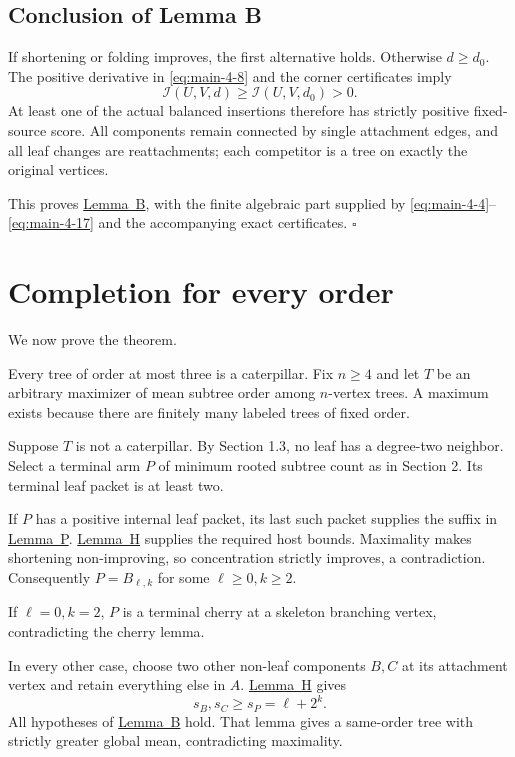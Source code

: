 \documentclass[11pt,letterpaper]{article}
\theoremstyle{plain}
\begin{document}
\subsection{Conclusion of Lemma B}\label{conclusion-of-lemma-b}

If shortening or folding improves, the first alternative holds. Otherwise \(d\ge d_0\). The positive derivative in \eqref{eq:main-4-8} and the corner certificates imply \[
\mathcal I(U,V,d)\ge\mathcal I(U,V,d_0)>0.
\] At least one of the actual balanced insertions therefore has strictly positive fixed-source score. All components remain connected by single attachment edges, and all leaf changes are reattachments; each competitor is a tree on exactly the original vertices.

This proves \hyperref[lem:broom]{Lemma~B}, with the finite algebraic part supplied by \eqref{eq:main-4-4}--\eqref{eq:main-4-17} and the accompanying exact certificates. \hfill\(\square\)

\section{Completion for every order}\label{completion-for-every-order}

We now prove the theorem.

Every tree of order at most three is a caterpillar. Fix \(n\ge4\) and let \(T\) be an arbitrary maximizer of mean subtree order among \(n\)-vertex trees. A maximum exists because there are finitely many labeled trees of fixed order.

Suppose \(T\) is not a caterpillar. By Section 1.3, no leaf has a degree-two neighbor. Select a terminal arm \(P\) of minimum rooted subtree count as in Section 2. Its terminal leaf packet is at least two.

If \(P\) has a positive internal leaf packet, its last such packet supplies the suffix in \hyperref[lem:packet]{Lemma~P}. \hyperref[lem:host]{Lemma~H} supplies the required host bounds. Maximality makes shortening non-improving, so concentration strictly improves, a contradiction. Consequently \(P=B_{\ell,k}\) for some \(\ell\ge0,k\ge2\).

If \(\ell=0,k=2\), \(P\) is a terminal cherry at a skeleton branching vertex, contradicting the cherry lemma.

In every other case, choose two other non-leaf components \(B,C\) at its attachment vertex and retain everything else in \(A\). \hyperref[lem:host]{Lemma~H} gives \[
s_B,s_C\ge s_P=\ell+2^k.
\] All hypotheses of \hyperref[lem:broom]{Lemma~B} hold. That lemma gives a same-order tree with strictly greater global mean, contradicting maximality.
\end{document}
